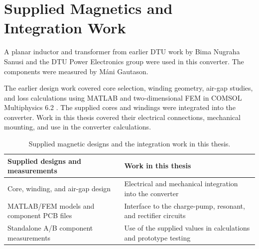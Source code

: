 \section{Supplied Magnetics and Integration Work}
\label{sec:mag-provenance}

A planar inductor and transformer from earlier DTU work by Bima Nugraha Sanusi and the DTU Power Electronics group were used in this converter. The components were measured by M\'ani Gautason.

The earlier design work covered core selection, winding geometry, air-gap studies, and loss calculations using MATLAB and two-dimensional FEM in COMSOL Multiphysics 6.2 \cite{comsol62}. The supplied cores and windings were integrated into the converter. Work in this thesis covered their electrical connections, mechanical mounting, and use in the converter calculations.

\begin{table}[htbp]
\centering
\caption{Supplied magnetic designs and the integration work in this thesis.}
\label{tab:mag-provenance-boundary}
\begin{tabularx}{\textwidth}{@{}p{}X@{}}
\toprule
Supplied designs and measurements & Work in this thesis\\
\midrule
Core, winding, and air-gap design & Electrical and mechanical integration into the converter\\
MATLAB/FEM models and component PCB files & Interface to the charge-pump, resonant, and rectifier circuits\\
Standalone A/B component measurements & Use of the supplied values in calculations and prototype testing\\
\bottomrule
\end{tabularx}
\end{table}
